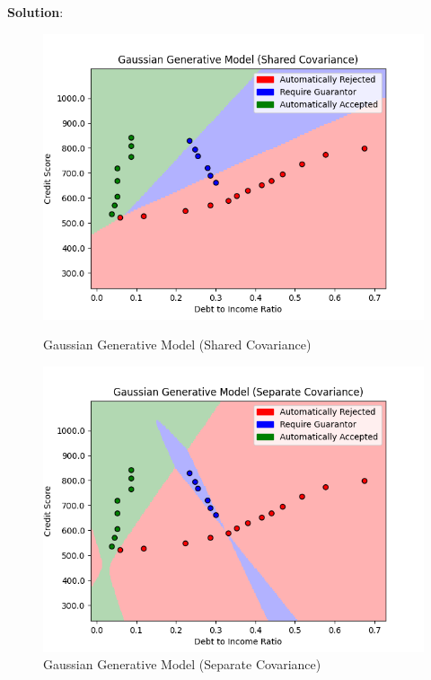 \documentclass[submit]{../harvardml}
\newenvironment{solution}{
    \vspace{2mm}
    \color{blue}\noindent\textbf{Solution}:
}{}
\begin{document}
\begin{solution}
\begin{tcolorbox}[colback=white,breakable]
  \begin{figure}[H]
      \centering
      \begin{minipage}[b]{0.48\textwidth}
          \includegraphics[width=\textwidth]{img_output/Gaussian Generative Model (Shared Covariance).png}
          \caption{Gaussian Generative Model (Shared Covariance)}
      \end{minipage}
      \hfill
      \begin{minipage}[b]{0.48\textwidth}
          \includegraphics[width=\textwidth]{img_output/Gaussian Generative Model (Separate Covariance).png}
          \caption{Gaussian Generative Model (Separate Covariance)}
      \end{minipage}
  \end{figure}
  

\end{tcolorbox}
\end{solution}
\end{document}
